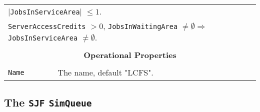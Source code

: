\documentclass[12pt]{book}
\begin{document}
\begin{tabular}{|l|l|l|l|}
\multicolumn{4}{|l|}{$|$\lstinline|JobsInServiceArea|$|$ $\leq 1$.} \\
\multicolumn{4}{|l|}{\lstinline|ServerAccessCredits| $> 0$, \lstinline|JobsInWaitingArea| $\neq \emptyset
                     \Rightarrow$ \lstinline|JobsInServiceArea| $\neq \emptyset$.} \\
\hline
\multicolumn{4}{|c|}{} \\
\multicolumn{4}{|c|}{\bf Operational Properties} \\
\multicolumn{4}{|c|}{} \\
\hline
\lstinline|Name| & \multicolumn{3}{|l|}{The name, default "LCFS".} \\
\hline
\end{tabular}

\subsection{The \lstinline{SJF} \lstinline{SimQueue}}
\end{document}
